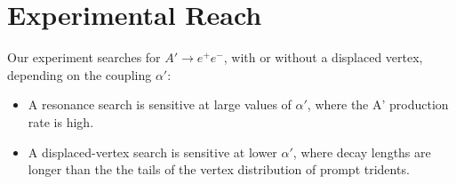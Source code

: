 \documentclass[b1]{sciposter}
\begin{document}
\begin{multicols}{3}
\begin{small}

	
% 
\end{small}
\columnbreak
	\section*{Experimental Reach}
Our experiment searches for $A'\to e^+e^-$, with or without a displaced vertex, depending on the coupling $\alpha'$:
\begin{small}
\begin{itemize}

\item A resonance search is sensitive at large values of $\alpha'$, where the A' production rate is high.
\item A displaced-vertex search is sensitive at lower $\alpha'$, where decay lengths are longer than the the tails of the vertex distribution of prompt tridents.
\end{itemize}
\end{small}
	

\end{multicols}
\end{document}
